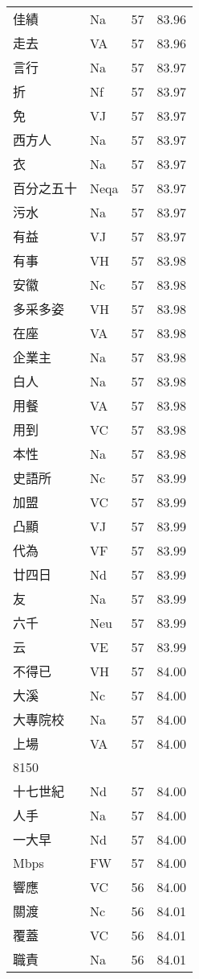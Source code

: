 \documentclass[twocolumn]{book}
\begin{document}
\begin{supertabular}{llrr}
佳績 & Na & 57 &  83.96\\
走去 & VA & 57 &  83.96\\
言行 & Na & 57 &  83.97\\
折 & Nf & 57 &  83.97\\
免 & VJ & 57 &  83.97\\
西方人 & Na & 57 &  83.97\\
衣 & Na & 57 &  83.97\\
百分之五十 & Neqa & 57 &  83.97\\
污水 & Na & 57 &  83.97\\
有益 & VJ & 57 &  83.97\\
有事 & VH & 57 &  83.98\\
安徽 & Nc & 57 &  83.98\\
多采多姿 & VH & 57 &  83.98\\
在座 & VA & 57 &  83.98\\
企業主 & Na & 57 &  83.98\\
白人 & Na & 57 &  83.98\\
用餐 & VA & 57 &  83.98\\
用到 & VC & 57 &  83.98\\
本性 & Na & 57 &  83.98\\
史語所 & Nc & 57 &  83.99\\
加盟 & VC & 57 &  83.99\\
凸顯 & VJ & 57 &  83.99\\
代為 & VF & 57 &  83.99\\
廿四日 & Nd & 57 &  83.99\\
友 & Na & 57 &  83.99\\
六千 & Neu & 57 &  83.99\\
云 & VE & 57 &  83.99\\
不得已 & VH & 57 &  84.00\\
大溪 & Nc & 57 &  84.00\\
大專院校 & Na & 57 &  84.00\\
上場 & VA & 57 &  84.00\\
8150\\
十七世紀 & Nd & 57 &  84.00\\
人手 & Na & 57 &  84.00\\
一大早 & Nd & 57 &  84.00\\
Mbps & FW & 57 &  84.00\\
響應 & VC & 56 &  84.00\\
關渡 & Nc & 56 &  84.01\\
覆蓋 & VC & 56 &  84.01\\
職責 & Na & 56 &  84.01\\

\end{supertabular}
\end{document}
